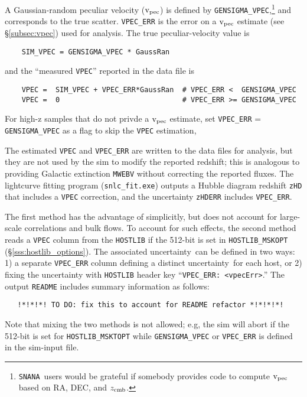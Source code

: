 \documentclass[12pt]{article}
\newcommand{\unc}{uncertainty}
\newcommand{\snana}{{\tt SNANA}}
\newcommand{\zcmb}{z_{\rm cmb}}
\newcommand{\vpec}{{\rm v}_{\rm pec}}
\begin{document}
A Gaussian-random peculiar velocity ($\vpec$) is defined by 
{\tt GENSIGMA\_VPEC},\footnote{\snana\ users would be grateful
  if somebody provides code to compute $\vpec$ based on
  RA, DEC, and $\zcmb$.}
and corresponds to the true scatter.
{\tt VPEC\_ERR} is the error on a $\vpec$ estimate 
(see \S\ref{subsec:vpec}) used for analysis.
The true peculiar-velocity value is 
\begin{verbatim} 
    SIM_VPEC = GENSIGMA_VPEC * GaussRan
\end{verbatim} 
and the ``measured {\tt VPEC}'' reported in the data file is
\begin{verbatim}
    VPEC =  SIM_VPEC + VPEC_ERR*GaussRan  # VPEC_ERR <  GENSIGMA_VPEC
    VPEC =  0                             # VPEC_ERR >= GENSIGMA_VPEC
\end{verbatim}
%
For high-z samples that do not privde a $\vpec$ estimate,
set {\tt VPEC\_ERR} = {\tt GENSIGMA\_VPEC} as a flag to
skip the {\tt VPEC} estimation,

The estimated {\tt VPEC} and {\tt VPEC\_ERR} are written to the 
data files for analysis, but they are not used by the sim to modify 
the reported redshift; this is analogous to providing 
Galactic extinction {\tt MWEBV} without correcting the reported fluxes.
The lightcurve fitting program ({\tt snlc\_fit.exe}) 
outputs a Hubble diagram redshift {\tt zHD} that includes a
{\tt VPEC} correction, and the uncertainty {\tt zHDERR} includes
{\tt VPEC\_ERR}.


The first method has the advantage of simplicitly, but does not
account for large-scale correlations and bulk flows.
To account for such effects, the second method reads a {\tt VPEC} 
column from the {\tt HOSTLIB} if the 512-bit is set in 
{\tt HOSTLIB\_MSKOPT} (\S\ref{sss:hostlib_options}). 
The associated \unc\ can be defined in two ways:
1) a separate {\tt VPEC\_ERR} column 
   defining a distinct \unc\ for each host, or 
2) fixing the uncertainty with {\tt HOSTLIB} header key 
``{\tt VPEC\_ERR: <vpecErr>}.''
The output {\tt README} includes summary information as follows:
\begin{verbatim}
   !*!*!*! TO DO: fix this to account for README refactor *!*!*!*!
\end{verbatim}


Note that mixing the two methods is not allowed;
e.g, the sim will abort if the 512-bit is set for {\tt HOSTLIB\_MSKTOPT}
while {\tt GENSIGMA\_VPEC} or {\tt VPEC\_ERR} 
is defined in the sim-input file.

   \clearpage
\end{document}
